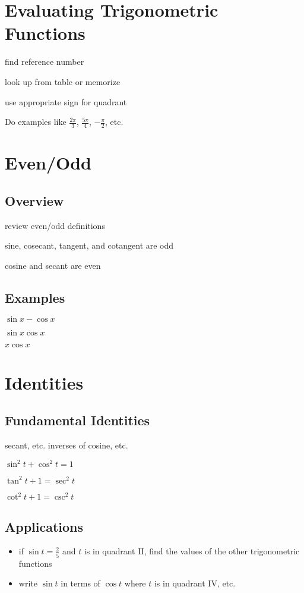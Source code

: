 \documentclass{exam}
\begin{document}
  \section{Evaluating Trigonometric Functions}

  \begin{itemize*}
    \item find reference number
    \item look up from table or memorize
    \item use appropriate sign for quadrant
  \end{itemize*}

  Do examples like $\frac{2 \pi}{3}$, $\frac{5 \pi}{4}$, $- \frac{\pi}{2}$, etc.

  \section{Even/Odd}
  \subsection{Overview}
  \begin{itemize*}
    \item review even/odd definitions
    \item sine, cosecant, tangent, and cotangent are odd

    \item cosine and secant are even

  \end{itemize*}

  \subsection{Examples}
  \begin{itemize*}
    \item $\sin x - \cos x$
    \item $\sin x \cos x$
    \item $x \cos x$ 
  \end{itemize*}

  \section{Identities}

  \subsection{Fundamental Identities}
  \begin{itemize*}
    \item secant, etc. inverses of cosine, etc.
    \item $\sin^2 t + \cos^2 t = 1$
    \item $\tan^2 t + 1 = \sec^2 t$
    \item $\cot^2 t + 1 = \csc^2 t$
  \end{itemize*}

  \subsection{Applications}

  \begin{itemize}
    \item if $\sin t = \frac{2}{5}$ and $t$ is in quadrant II, find the values of the other trigonometric functions
    \item write $\sin t$ in terms of $\cos t$ where $t$ is in quadrant IV, etc.
  \end{itemize}
\end{document}
